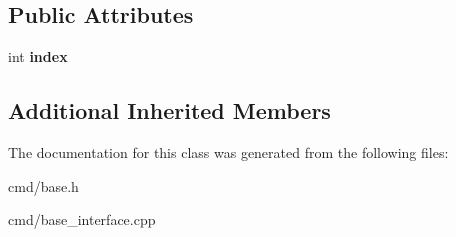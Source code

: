 \subsection*{Public Attributes}
\begin{DoxyCompactItemize}
\item 
int {\bfseries index}\hypertarget{classBaseInterface_1_1Room_1_1Goto_abf032777f8c511b443cb0176e9620a47}{}\label{classBaseInterface_1_1Room_1_1Goto_abf032777f8c511b443cb0176e9620a47}

\end{DoxyCompactItemize}
\subsection*{Additional Inherited Members}


The documentation for this class was generated from the following files\+:\begin{DoxyCompactItemize}
\item 
cmd/base.\+h\item 
cmd/base\+\_\+interface.\+cpp\end{DoxyCompactItemize}
